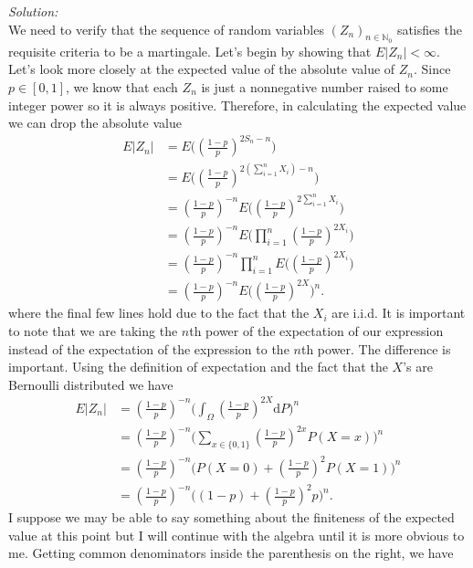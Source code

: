\documentclass[10pt]{amsart}
\newcommand{\D}{\mathrm{d}}
\begin{document}
\noindent
\textit{Solution:} \\
We need to verify that the sequence of random variables $(Z_n)_{n \in \mathbb N_0}$ satisfies the requisite criteria to be a martingale.
Let's begin by showing that $E|Z_n| < \infty$.
Let's look more closely at the expected value of the absolute value of $Z_n$.
Since $p \in [0, 1]$, we know that each $Z_n$ is just a nonnegative number raised to some integer power so it is always positive.
Therefore, in calculating the expected value we can drop the absolute value
\begin{align*}
E|Z_n| &= E\Bigg(\left(\frac{1-p}{p} \right)^{2S_n-n}\Bigg) \\
	&= E\bigg(\left(\frac{1-p}{p} \right)^{2(\sum_{i=1}^n X_i)-n}\bigg) \\
	&= \left(\frac{1-p}{p} \right)^{-n} E\Bigg(\left(\frac{1-p}{p} \right)^{2\sum_{i=1}^n X_i}\Bigg) \\
	&= \left(\frac{1-p}{p} \right)^{-n} E\Bigg( \prod_{i = 1}^n \left(\frac{1-p}{p} \right)^{2 X_i}\Bigg) \\
	&= \left(\frac{1-p}{p} \right)^{-n}\prod_{i = 1}^n E\Bigg( \left(\frac{1-p}{p} \right)^{2 X_i}\Bigg) \\
	&= \left(\frac{1-p}{p} \right)^{-n} E\Bigg( \left(\frac{1-p}{p} \right)^{2 X}\Bigg)^n.
\end{align*}
where the final few lines hold due to the fact that the $X_i$ are i.i.d.
It is important to note that we are taking the $n$th power of the expectation of our expression instead of the expectation of the expression  to the $n$th power. The difference is important.
Using the definition of expectation and the fact that the $X$'s are Bernoulli distributed we have
\begin{align*}
E|Z_n| &= \left(\frac{1-p}{p} \right)^{-n} \Bigg(\int_\Omega \left(\frac{1-p}{p} \right)^{2 X} \D P \Bigg)^n \\
	&= \left(\frac{1-p}{p} \right)^{-n} \Bigg(\sum_{x \in \{0, 1\}} \left(\frac{1-p}{p} \right)^{2 x} P(X = x) \Bigg)^n \\
	&= \left(\frac{1-p}{p} \right)^{-n} \Bigg(P(X = 0) + \left(\frac{1-p}{p} \right)^2 P(X = 1)\Bigg)^n \\
	&= \left(\frac{1-p}{p} \right)^{-n} \Bigg((1-p) + \left(\frac{1-p}{p} \right)^2 p\Bigg)^n.
\end{align*}
I suppose we may be able to say something about the finiteness of the expected value at this point but I will continue with the algebra until it is more obvious to me.
Getting common denominators inside the parenthesis on the right, we have
\end{document}
